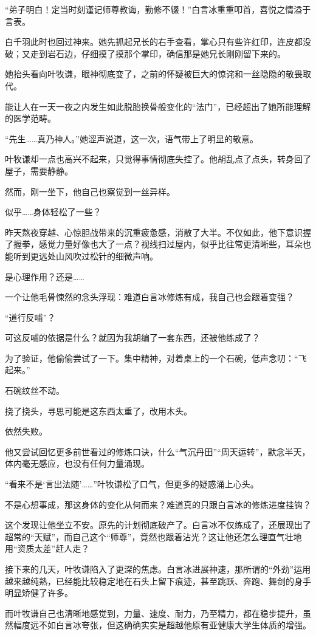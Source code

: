 “弟子明白！定当时刻谨记师尊教诲，勤修不辍！”白言冰重重叩首，喜悦之情溢于言表。

白千羽此时也回过神来。她先抓起兄长的右手查看，掌心只有些许红印，连皮都没破；又走到岩石边，仔细摸了摸那个掌印，确信那是她兄长刚刚留下来的。

她抬头看向叶牧谦，眼神彻底变了，之前的怀疑被巨大的惊诧和一丝隐隐的敬畏取代。

能让人在一天一夜之内发生如此脱胎换骨般变化的“法门”，已经超出了她所能理解的医学范畴。

“先生……真乃神人。”她涩声说道，这一次，语气带上了明显的敬意。

叶牧谦却一点也高兴不起来，只觉得事情彻底失控了。他胡乱点了点头，转身回了屋子，需要静静。

然而，刚一坐下，他自己也察觉到一丝异样。

似乎……身体轻松了一些？

昨天熬夜穿越、心惊胆战带来的沉重疲惫感，消散了大半。不仅如此，他下意识握了握拳，感觉力量好像也大了一点？视线扫过屋内，似乎比往常更清晰些，耳朵也能听到更远处山风吹过松针的细微声响。

是心理作用？还是……

一个让他毛骨悚然的念头浮现：难道白言冰修炼有成，我自己也会跟着变强？

“道行反哺”？

可这反哺的依据是什么？就因为我胡编了一套东西，还被他练成了？

为了验证，他偷偷尝试了一下。集中精神，对着桌上的一个石碗，低声念叨：“飞起来。”

石碗纹丝不动。

挠了挠头，寻思可能是这东西太重了，改用木头。

依然失败。

他又尝试回忆更多前世看过的修炼口诀，什么“气沉丹田”“周天运转”，默念半天，体内毫无感应，也没有任何力量涌现。

“看来不是‘言出法随’……”叶牧谦松了口气，但更多的疑惑涌上心头。

不是心想事成，那这身体的变化从何而来？难道真的只跟白言冰的修炼进度挂钩？

这个发现让他坐立不安。原先的计划彻底破产了。白言冰不仅练成了，还展现出了超常的“天赋”，而自己这个“师尊”，竟然也跟着沾光？这让他还怎么理直气壮地用“资质太差”赶人走？

接下来的几天，叶牧谦陷入了更深的焦虑。白言冰进展神速，那所谓的“外劲”运用越来越纯熟，已经能比较稳定地在石头上留下痕迹，甚至跳跃、奔跑、舞剑的身手明显矫健了许多。

而叶牧谦自己也清晰地感觉到，力量、速度、耐力，乃至精力，都在稳步提升，虽然幅度远不如白言冰夸张，但这确确实实是超越他原有亚健康大学生体质的增强。

